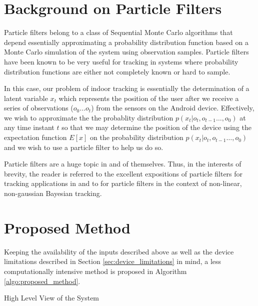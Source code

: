 \section{Background on Particle Filters}
Particle filters belong to a class of Sequential Monte Carlo algorithms 
that depend essentially approximating a probability distribution function based
on a Monte Carlo simulation of the system using observation samples. Particle 
filters have been known to be very useful for tracking in systems where 
probability distribution functions are either not completely known or hard 
to sample. 

In this case, our problem of indoor tracking is essentially the 
determination of a latent variable $x_t$ which represents the position of the 
user after we receive a series of observations ($o_0 \dots o_t$) from the 
sensors on the Android device. Effectively, we wish to approximate the the 
probablity distribution $p(x_t|o_t,o_{t-1}\dots,o_0)$ at any time instant $t$
so that we may determine the position of the device using the expectation 
function $E[x]$ on the probability distribution $p(x_t|o_t,o_{t-1}\dots,o_0)$
and we wish to use a particle filter to help us do so.

Particle filters are a huge topic in and of themselves. Thus, in the interests
of brevity, the reader is referred to the excellent expositions of particle 
filters for tracking applications in \cite{Ristic} and to \cite{Arulampalam}
for particle filters in the context of non-linear, non-gaussian Bayesian
tracking.


\section{Proposed Method}

Keeping the availability of the inputs described above as well as the device 
limitations described in Section \ref{sec:device_limitations} in mind, a less 
computationally intensive method is proposed in 
Algorithm \ref{algo:proposed_method}.

\begin{algorithm}
\caption{High Level View of the System\label{algo:proposed_method}}
\end{algorithm}

